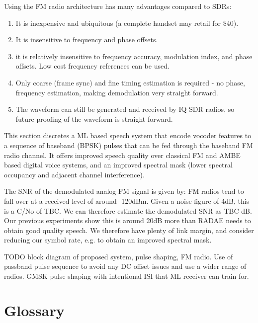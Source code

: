 \documentclass{article}
\begin{document}
Using the FM radio architecture has many advantages compared to SDRs:
\begin{enumerate}
\item It is inexpensive and ubiquitous (a complete handset may retail for \$40).
\item It is insensitive to frequency and phase offsets.
\item it is relatively insensitive to frequency accuracy, modulation index, and phase offsets. Low cost frequency references can be used.
\item Only coarse (frame sync) and fine timing estimation is required - no phase, frequency estimation, making demodulation very straight forward.
\item The waveform can still be generated and received by IQ SDR radios, so future proofing of the waveform is straight forward.
\end{enumerate}

This section discretes a ML based speech system that encode vocoder features to a sequence of baseband (BPSK) pulses that can be fed through the baseband FM radio channel.  It offers improved speech quality over classical FM and AMBE based digital voice systems, and an improved spectral mask (lower spectral occupancy and adjacent channel interference). 

The SNR of the demodulated analog FM signal is given by:
FM radios tend to fall over at a received level of around -120dBm.  Given a noise figure of 4dB, this is a C/No of TBC.  We can therefore estimate the demodulated SNR as TBC dB.  Our previous experiments show this is around 20dB more than RADAE needs to obtain good quality speech.  We therefore have plenty of link margin, and consider reducing our symbol rate, e.g. to obtain an improved spectral mask.

TODO block diagram of proposed system, pulse shaping, FM radio.  Use of passband pulse sequence to avoid any DC offset issues and use a wider range of radios. GMSK pulse shaping with intentional ISI that ML receiver can train for.

\section{Glossary}
\end{document}
